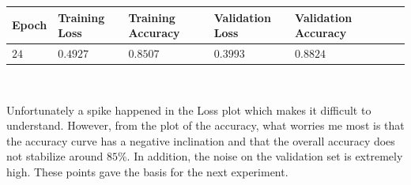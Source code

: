 \documentclass[11pt,a4paper]{article}
\begin{document}
\begin{center}
\begin{tabular}{|p{1.2cm}|p{1.8cm}|p{2cm}|p{2cm}|p{2cm}|p{2cm}|p{2cm}|}
\rowcolor{gray!50}
\hline
\textbf{Epoch} & \textbf{Training Loss} & \textbf{Training Accuracy} & \textbf{Validation Loss} & \textbf{Validation Accuracy}\\
\hline
$24$ & $0.4927$ & $0.8507$ & $0.3993$ & $0.8824$\\
\hline
\end{tabular}\\
\end{center}
Unfortunately a spike happened in the Loss plot which makes it difficult to understand. However, from the plot of the accuracy, what worries me most is that the accuracy curve has a negative inclination and that the overall accuracy does not stabilize around $85\%$. In addition, the noise on the validation set is extremely high. These points gave the basis for the next experiment.
\end{document}
